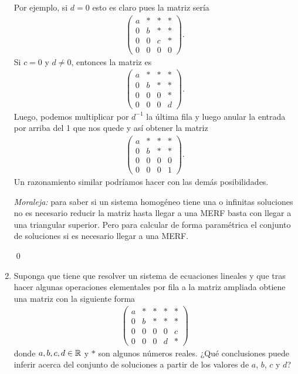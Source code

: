 \begin{enumerate}[topsep=6pt, itemsep=.4cm]
Por ejemplo, si $d=0$ esto es claro pues la matriz sería
\begin{align*}
\left(
\begin{array}{cccc}
a & * & * & *\\
0 & b & * & *\\
0 & 0 & c & *\\
0 & 0 & 0 & 0
\end{array}
\right).
\end{align*}
Si $c=0$ y $d\neq0$, entonces la matriz es 
\begin{align*}
\left(
\begin{array}{cccc}
a & * & * & *\\
0 & b & * & *\\
0 & 0 & 0 & *\\
0 & 0 & 0 & d
\end{array}
\right).
\end{align*}
Luego, podemos multiplicar por $d^{-1}$ la última fila y luego anular la entrada por arriba del 1 que nos quede y así obtener la matriz
\begin{align*}
\left(
\begin{array}{cccc}
a & * & * & *\\
0 & b & * & *\\
0 & 0 & 0 & 0\\
0 & 0 & 0 & 1
\end{array}
\right).
\end{align*}
Un razonamiento similar podríamos hacer con las demás posibilidades.

\textit{Moraleja:} para saber si un sistema homogéneo tiene una o infinitas soluciones no es necesario reducir la matriz hasta llegar a una MERF basta con llegar a una triangular superior. Pero para calcular de forma paramétrica el conjunto de soluciones si es necesario llegar a una MERF.

\qed

\item Suponga que tiene que resolver un sistema de ecuaciones lineales y que tras hacer algunas operaciones elementales por fila a la matriz ampliada obtiene una matriz con la siguiente forma
\begin{align*}
\left(
\begin{array}{cccc|c}
a & * & * & * & *\\
0 & b & * & * & *\\
0 & 0 & 0 & 0 & c\\
0 & 0 & 0 & d & *
\end{array}
\right)
\end{align*}
donde $a,b,c,d\in\mathbb R$ y $*$ son algunos números reales.
¿Qué conclusiones puede inferir acerca del conjunto de soluciones a partir de los valores de $a$, $b$, $c$ y $d$?


\end{enumerate}
